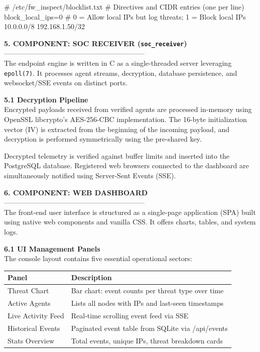 \documentclass[12pt,a4paper]{article}
\newcommand{\thfmt}[1]{\textbf{#1}}
\begin{document}
\begin{codeblock}
# /etc/fw_inspect/blocklist.txt
# Directives and CIDR entries (one per line)
block_local_ips=0   # 0 = Allow local IPs but log threats; 1 = Block local IPs
10.0.0.0/8
192.168.1.50/32
\end{codeblock}

\vspace{1.5em}
\textbf{5. COMPONENT: SOC RECEIVER (\texttt{soc\_receiver})}\\
------------------------------------------------------------\\
The endpoint engine is written in C as a single-threaded server leveraging \texttt{epoll(7)}. It processes agent streams, decryption, database persistence, and websocket/SSE events on distinct ports.

\textbf{5.1 Decryption Pipeline}\\
Encrypted payloads received from verified agents are processed in-memory using OpenSSL libcrypto's AES-256-CBC implementation. The 16-byte initialization vector (IV) is extracted from the beginning of the incoming payload, and decryption is performed symmetrically using the pre-shared key.

Decrypted telemetry is verified against buffer limits and inserted into the PostgreSQL database. Registered web browsers connected to the dashboard are simultaneously notified using Server-Sent Events (SSE).

\vspace{1.5em}
\textbf{6. COMPONENT: WEB DASHBOARD}\\
------------------------------------------------------------\\
The front-end user interface is structured as a single-page application (SPA) built using native web components and vanilla CSS. It offers charts, tables, and system logs.

\textbf{6.1 UI Management Panels}\\
The console layout contains five essential operational sectors:

\begin{center}
\begin{tabular}{L{4cm} L{10.5cm}}
\hline
\thfmt{Panel} & \thfmt{Description} \\
\hline
Threat Chart       & Bar chart: event counts per threat type over time \\
Active Agents      & Lists all nodes with IPs and last-seen timestamps \\
Live Activity Feed & Real-time scrolling event feed via SSE \\
Historical Events  & Paginated event table from SQLite via /api/events \\
Stats Overview     & Total events, unique IPs, threat breakdown cards \\
\hline
\end{tabular}
\end{center}
\end{document}
